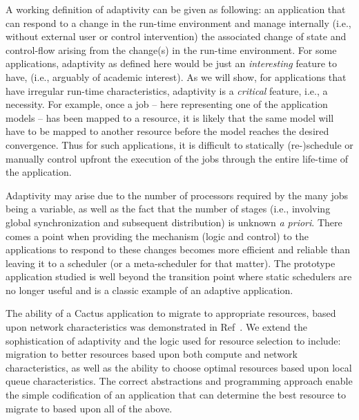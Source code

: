 \documentclass[conference,final]{IEEEtran}
\begin{document}
A working definition of adaptivity can be given as following: an
application that can respond to a change in the run-time environment
and manage internally (i.e., without external user or control
intervention) the associated change of state and control-flow arising
from the change(s) in the run-time environment.  For some
applications, adaptivity as defined here would be just an {\it
  interesting} feature to have, (i.e., arguably of academic interest).
As we will show, for applications that have irregular run-time
characteristics, adaptivity is a {\it critical} feature, i.e., a
necessity.  For example, once a job -- here representing one of the
application models -- has been mapped to a resource, it is likely that
the same model will have to be mapped to another resource before the
model reaches the desired convergence.  Thus for such applications, it
is difficult to statically (re-)schedule or manually control upfront
the execution of the jobs through the entire life-time of the
application.

Adaptivity may arise due to the number of processors required by the
many jobs being a variable, as well as the fact that the number of
stages (i.e., involving global synchronization and subsequent
distribution) is unknown {\it a priori}. There comes a point when
providing the mechanism (logic and control) to the applications to
respond to these changes becomes more efficient and reliable than
leaving it to a scheduler (or a meta-scheduler for that matter).  The
prototype application studied is well beyond the transition point
where static schedulers are no longer useful and is a classic example
of an adaptive application.

The ability of a Cactus application to migrate to appropriate
resources, based upon network characteristics was demonstrated in
Ref~\cite{escience07}.  We extend the sophistication of adaptivity and
the logic used for resource selection to include: migration to better
resources based upon both compute and network characteristics, as well
as the ability to choose optimal resources based upon local queue
characteristics. The correct abstractions and programming approach
enable the simple codification of an application that can determine
the best resource to migrate to based upon all of the above.
\end{document}
